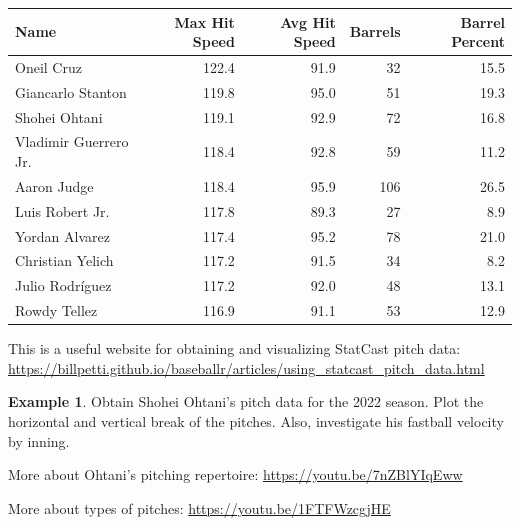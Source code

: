 \documentclass[
  11pt,
]{book}
\theoremstyle{definition}
\theoremstyle{definition}
\newtheorem{example}{Example}[chapter]
\theoremstyle{definition}
\theoremstyle{definition}
\theoremstyle{remark}
\begin{document}
\begin{tabular}{lrrrr}
\toprule
Name & Max Hit Speed & Avg Hit Speed & Barrels & Barrel Percent\\
\midrule
Oneil Cruz & 122.4 & 91.9 & 32 & 15.5\\
Giancarlo Stanton & 119.8 & 95.0 & 51 & 19.3\\
Shohei Ohtani & 119.1 & 92.9 & 72 & 16.8\\
Vladimir Guerrero Jr. & 118.4 & 92.8 & 59 & 11.2\\
Aaron Judge & 118.4 & 95.9 & 106 & 26.5\\
\addlinespace
Luis Robert Jr. & 117.8 & 89.3 & 27 & 8.9\\
Yordan Alvarez & 117.4 & 95.2 & 78 & 21.0\\
Christian Yelich & 117.2 & 91.5 & 34 & 8.2\\
Julio Rodríguez & 117.2 & 92.0 & 48 & 13.1\\
Rowdy Tellez & 116.9 & 91.1 & 53 & 12.9\\
\bottomrule
\end{tabular}

\newpage

This is a useful website for obtaining and visualizing StatCast pitch data:\\
\url{https://billpetti.github.io/baseballr/articles/using_statcast_pitch_data.html}

\begin{example}
Obtain Shohei Ohtani's pitch data for the 2022 season. Plot the horizontal and vertical break of the pitches. Also, investigate his fastball velocity by inning.

More about Ohtani's pitching repertoire: \url{https://youtu.be/7nZBlYIqEww}

More about types of pitches: \url{https://youtu.be/1FTFWzcgjHE}
\end{example}
\end{document}
